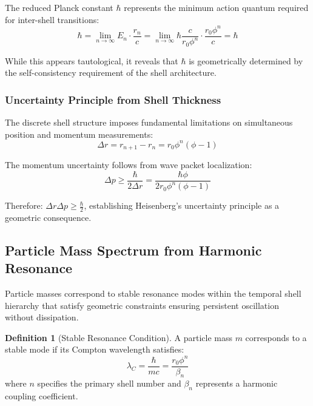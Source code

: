 \documentclass[12pt,a4paper]{article}
\theoremstyle{plain}
\theoremstyle{definition}
\newtheorem{definition}{Definition}[section]
\begin{document}
The reduced Planck constant $\hbar$ represents the minimum action quantum required for inter-shell transitions:
\begin{equation}
\hbar = \lim_{n \to \infty} E_n \cdot \frac{r_n}{c} = \lim_{n \to \infty} \hbar \frac{c}{r_0 \phi^n} \cdot \frac{r_0 \phi^n}{c} = \hbar
\end{equation}

While this appears tautological, it reveals that $\hbar$ is geometrically determined by the self-consistency requirement of the shell architecture.

\subsubsection{Uncertainty Principle from Shell Thickness}

The discrete shell structure imposes fundamental limitations on simultaneous position and momentum measurements:
\begin{equation}
\Delta r = r_{n+1} - r_n = r_0 \phi^n (\phi - 1)
\end{equation}

The momentum uncertainty follows from wave packet localization:
\begin{equation}
\Delta p \geq \frac{\hbar}{2\Delta r} = \frac{\hbar \phi}{2r_0 \phi^n (\phi - 1)}
\end{equation}

Therefore: $\Delta r \Delta p \geq \frac{\hbar}{2}$, establishing Heisenberg's uncertainty principle as a geometric consequence.

\subsection{Particle Mass Spectrum from Harmonic Resonance}

Particle masses correspond to stable resonance modes within the temporal shell hierarchy that satisfy geometric constraints ensuring persistent oscillation without dissipation.

\begin{definition}[Stable Resonance Condition]
A particle mass $m$ corresponds to a stable mode if its Compton wavelength satisfies:
\begin{equation}
\lambda_C = \frac{\hbar}{mc} = \frac{r_0 \phi^n}{\beta_n}
\end{equation}
where $n$ specifies the primary shell number and $\beta_n$ represents a harmonic coupling coefficient.
\end{definition}
\end{document}
